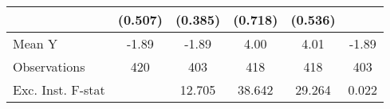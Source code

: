 {\begin{tabular}{l*{5}{c}}
            &     (0.507)         &     (0.385)         &     (0.718)         &     (0.536)         &                     \\
\midrule
Mean Y      &       -1.89         &       -1.89         &        4.00         &        4.01         &       -1.89         \\
Observations&         420         &         403         &         418         &         418         &         403         \\
Exc. Inst. F-stat&                     &      12.705         &      38.642         &      29.264         &       0.022         \\
\bottomrule
\end{tabular}
}
